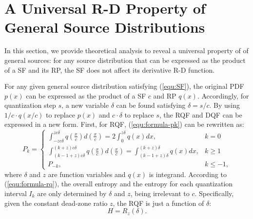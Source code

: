 \documentclass[smallabstract,smallcaptions]{dccpaper}
\begin{document}
\section{A Universal R-D Property of General Source Distributions}
\label{sec:property}

In this section, we provide theoretical analysis to reveal a universal property of of general sources: for any source distribution that can be expressed as the product of a SF and its RP, the SF does not affect its derivative R-D function.

For any given general source distribution satisfying (\ref{equ:SF}), the original PDF $p(x)$ can be expressed as the product of a SF $c$ and RP $q(x)$. Accordingly, for quantization step $s$, a new variable $\delta$ can be found satisfying $\delta = s/c$. By using $1/c \cdot q(x/c)$ to replace $p(x)$ and $c \cdot \delta$ to replace $s$, the RQF and DQF can be expressed in a new form. First, for RQF, (\ref{equ:formula-pk}) can be rewritten as:
\begin{equation}\label{equ:formula-pknew}
	P_k =
	\begin{cases}
		\int_{-z c\delta}^{z c\delta} q\left(\frac{x}{c}\right) d\left(\frac{x}{c}\right)
		= 2 \int_{0}^{z \delta} q(x) dx,
		& k=0 \\
		\int_{(k-1+z) c\delta}^{(k+z) c\delta} q\left(\frac{x}{c}\right) d\left(\frac{x}{c}\right)
		=\int_{(k-1+z) \delta}^{(k+z) \delta} q(x) dx,
		& k \ge 1 \\
		P_{-k},
		& k \le -1 ,
	\end{cases}
\end{equation} 
where $\delta$ and $z$ are function variables and $q(x)$ is integrand. According to (\ref{equ:formula-rq}), the overall entropy and the entropy for each quantization interval $I_k$ are only determined by $\delta$ and $z$, being irrelevant to $c$. Specifically, given the constant dead-zone ratio $z$, the RQF is just a function of $\delta$: 
\begin{equation}\label{equ:formula-rqnew}
	H = R_z(\delta).
\end{equation}
\end{document}
